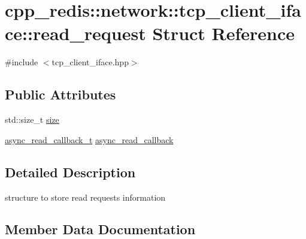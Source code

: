\hypertarget{structcpp__redis_1_1network_1_1tcp__client__iface_1_1read__request}{}\section{cpp\+\_\+redis\+:\+:network\+:\+:tcp\+\_\+client\+\_\+iface\+:\+:read\+\_\+request Struct Reference}
\label{structcpp__redis_1_1network_1_1tcp__client__iface_1_1read__request}


{\ttfamily \#include $<$tcp\+\_\+client\+\_\+iface.\+hpp$>$}

\subsection*{Public Attributes}
\begin{DoxyCompactItemize}
\item 
std\+::size\+\_\+t \hyperlink{structcpp__redis_1_1network_1_1tcp__client__iface_1_1read__request_a5ff8258391c9b3c8d2ce1a5c5a0304be}{size}
\item 
\hyperlink{classcpp__redis_1_1network_1_1tcp__client__iface_ae8bf79e8e1f1d7e359ed1c7cdc4026fc}{async\+\_\+read\+\_\+callback\+\_\+t} \hyperlink{structcpp__redis_1_1network_1_1tcp__client__iface_1_1read__request_a0584269b3a021d588e38948c12fa5292}{async\+\_\+read\+\_\+callback}
\end{DoxyCompactItemize}


\subsection{Detailed Description}
structure to store read requests information 

\subsection{Member Data Documentation}
\mbox{\label{structcpp__redis_1_1network_1_1tcp__client__iface_1_1read__request_a0584269b3a021d588e38948c12fa5292}} 
